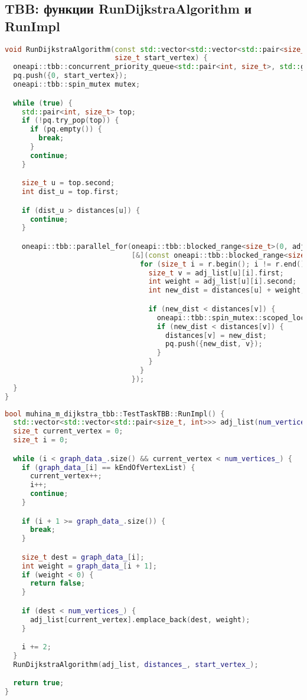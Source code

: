 \documentclass[12pt]{article}
\begin{document}
\subsection*{TBB: функции RunDijkstraAlgorithm и RunImpl }
\begin{lstlisting}[language=C++]
void RunDijkstraAlgorithm(const std::vector<std::vector<std::pair<size_t, int>>> &adj_list, std::vector<int> &distances,
                          size_t start_vertex) {
  oneapi::tbb::concurrent_priority_queue<std::pair<int, size_t>, std::greater<>> pq;
  pq.push({0, start_vertex});
  oneapi::tbb::spin_mutex mutex;

  while (true) {
    std::pair<int, size_t> top;
    if (!pq.try_pop(top)) {
      if (pq.empty()) {
        break;
      }
      continue;
    }

    size_t u = top.second;
    int dist_u = top.first;

    if (dist_u > distances[u]) {
      continue;
    }

    oneapi::tbb::parallel_for(oneapi::tbb::blocked_range<size_t>(0, adj_list[u].size()),
                              [&](const oneapi::tbb::blocked_range<size_t> &r) {
                                for (size_t i = r.begin(); i != r.end(); ++i) {
                                  size_t v = adj_list[u][i].first;
                                  int weight = adj_list[u][i].second;
                                  int new_dist = distances[u] + weight;

                                  if (new_dist < distances[v]) {
                                    oneapi::tbb::spin_mutex::scoped_lock lock(mutex);
                                    if (new_dist < distances[v]) {
                                      distances[v] = new_dist;
                                      pq.push({new_dist, v});
                                    }
                                  }
                                }
                              });
  }
}
\end{lstlisting}
\begin{lstlisting}[language=C++]
bool muhina_m_dijkstra_tbb::TestTaskTBB::RunImpl() {
  std::vector<std::vector<std::pair<size_t, int>>> adj_list(num_vertices_);
  size_t current_vertex = 0;
  size_t i = 0;

  while (i < graph_data_.size() && current_vertex < num_vertices_) {
    if (graph_data_[i] == kEndOfVertexList) {
      current_vertex++;
      i++;
      continue;
    }

    if (i + 1 >= graph_data_.size()) {
      break;
    }

    size_t dest = graph_data_[i];
    int weight = graph_data_[i + 1];
    if (weight < 0) {
      return false;
    }

    if (dest < num_vertices_) {
      adj_list[current_vertex].emplace_back(dest, weight);
    }

    i += 2;
  }
  RunDijkstraAlgorithm(adj_list, distances_, start_vertex_);

  return true;
}

\end{lstlisting}
\end{document}
